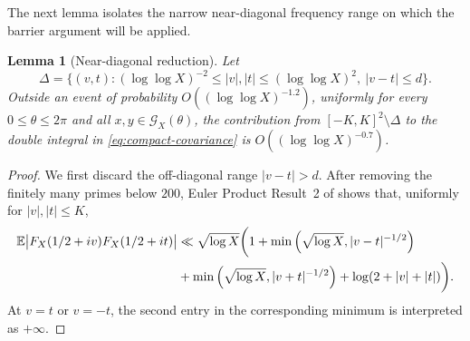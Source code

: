 \documentclass[a4paper,12pt,reqno]{amsart}
\numberwithin{equation}{section}
\newtheorem{lemma}[theorem]{Lemma}
\theoremstyle{remark}
\newcommand{\E}{\mathbb{E}}
\begin{document}
The next lemma isolates the narrow near-diagonal frequency range on which
the barrier argument will be applied.

\begin{lemma}[Near-diagonal reduction]
\label{lem:cov-near-diagonal}
Let
\[
 \Delta=\{(v,t):(\log\log X)^{-2}\leq |v|,|t|\leq(\log\log X)^2,
 \ |v-t|\leq d\}.
\]
Outside an event of probability $O((\log\log X)^{-1.2})$, uniformly
for every $0\leq\theta\leq2\pi$ and all
$x,y\in{\mathcal G}_X(\theta)$, the contribution  from
\(
 [-K,K]^2\setminus\Delta
\) to the double integral in
\eqref{eq:compact-covariance} is $O((\log\log X)^{-0.7})$.
\end{lemma}

\begin{proof}
We first discard the off-diagonal range $|v-t|>d$. After removing the
finitely many primes below $200$, Euler Product Result~2 of
\cite[Section~2.3]{Harper2023Large} shows that, uniformly for
$|v|,|t|\leq K$,
\begin{align}
 \E\big|F_X(1/2+iv)F_X(1/2+it)\big|
 &\ll \sqrt{\log X}\bigg(
 1+\min\left(\sqrt{\log X},|v-t|^{-1/2}\right)\notag\\
 &+\min\left(\sqrt{\log X},|v+t|^{-1/2}\right)
 +\log(2+|v|+|t|)\bigg).
 \label{eq:two-point-R-far}
\end{align}
At $v=t$ or $v=-t$, the second entry in the corresponding minimum is
interpreted as $+\infty$. 


\end{proof}
\end{document}
